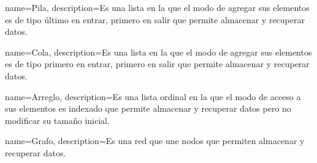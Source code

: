 {
  name=Pila,
  description={Es una lista en la que el modo de agregar sus elementos es de tipo 
	último en entrar, primero en salir que permite almacenar y recuperar datos.}
}

{
  name=Cola,
  description={Es una lista en la que el modo de agregar sus elementos es de tipo 
	primero en entrar, primero en salir que permite almacenar y recuperar datos.}
}

{
  name=Arreglo,
  description={Es una lista ordinal en la que el modo de acceso a sus elementos 
  es indexado que permite almacenar y recuperar datos pero no modificar su
  tamaño inicial.}
}

{
  name=Grafo,
  description={Es una red que une nodos que permiten almacenar y recuperar datos.}
}
